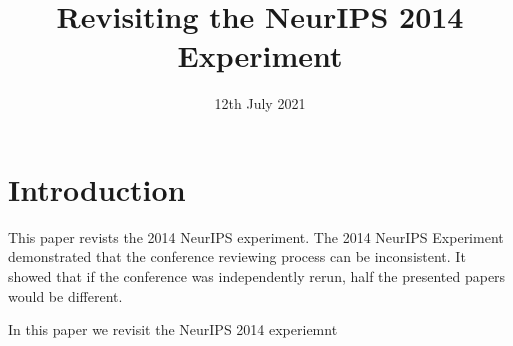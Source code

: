 \documentclass[]{article}
\title{Revisiting the NeurIPS 2014 Experiment}
\author{}
\date{12th July 2021}
\begin{document}
\maketitle

\section{Introduction}

This paper revists the 2014 NeurIPS experiment. The 2014 NeurIPS Experiment demonstrated that the conference reviewing process can be inconsistent. It showed that if the conference was independently rerun, half the presented papers would be different. 

In this paper we revisit the NeurIPS 2014 experiemnt
\end{document}
